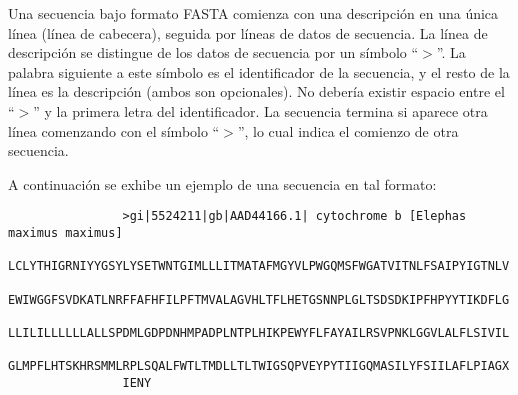 \documentclass[12pt,a4paper,spanish]{article}
\begin{document}
		\par Una secuencia bajo formato \textsc{FASTA} comienza con una descripción en una única línea (línea de cabecera), seguida por líneas de datos de 			secuencia. La línea de descripción se distingue de los datos de secuencia por un símbolo ``$>$''. La palabra siguiente a este símbolo es el 		identificador de la secuencia, y el resto de la línea es la descripción (ambos son opcionales). No debería existir espacio entre el ``$>$'' y la 			primera letra del identificador. La secuencia termina si aparece otra línea comenzando con el símbolo ``$>$'', lo cual indica el comienzo de otra 			secuencia. 
		\par A continuación se exhibe un ejemplo de una secuencia en tal formato:	
		\begin{verbatim}
				>gi|5524211|gb|AAD44166.1| cytochrome b [Elephas maximus maximus]
				LCLYTHIGRNIYYGSYLYSETWNTGIMLLLITMATAFMGYVLPWGQMSFWGATVITNLFSAIPYIGTNLV
				EWIWGGFSVDKATLNRFFAFHFILPFTMVALAGVHLTFLHETGSNNPLGLTSDSDKIPFHPYYTIKDFLG
				LLILILLLLLLALLSPDMLGDPDNHMPADPLNTPLHIKPEWYFLFAYAILRSVPNKLGGVLALFLSIVIL
				GLMPFLHTSKHRSMMLRPLSQALFWTLTMDLLTLTWIGSQPVEYPYTIIGQMASILYFSIILAFLPIAGX
				IENY
		\end{verbatim}
\end{document}
